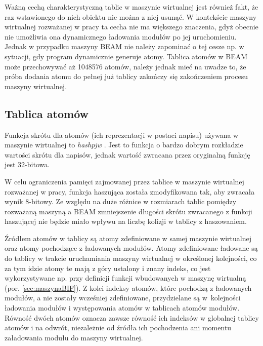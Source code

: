 Ważną cechą charakterystyczną tablic w maszynie wirtualnej jest również fakt, że raz wstawionego do nich obiektu nie można z niej usunąć. W kontekście maszyny wirtualnej rozważanej w pracy ta cecha nie ma większego znaczenia, gdyż obecnie nie umożliwia ona dynamicznego ładowania modułów po jej uruchomieniu. Jednak w przypadku maszyny BEAM nie należy zapominać o tej cesze np. w sytuacji, gdy program dynamicznie generuje atomy. Tablica atomów w BEAM może przechowywać aż 1048576 atomów, należy jednak mieć na uwadze to, że próba dodania atomu do pełnej już tablicy zakończy się zakończeniem procesu maszyny wirtualnej.

\subsection{Tablica atomów}
\label{sub:maszynaTablicaAtomow}

Funkcja skrótu dla atomów (ich reprezentacji w postaci napisu) używana w maszynie wirtualnej to \emph{hashpjw} \cite{Aho1986}. Jest to funkcja o bardzo dobrym rozkładzie wartości skrótu dla napisów, jednak wartość zwracana przez oryginalną funkcję jest 32-bitowa.

W celu ograniczenia pamięci zajmowanej przez tablice w maszynie wirtualnej rozważanej w pracy, funkcja haszująca została zmodyfikowana tak, aby zwracała wynik 8-bitowy. Ze względu na duże różnice w rozmiarach tablic pomiędzy rozważaną maszyną a BEAM zmniejszenie długości skrótu zwracanego z funkcji haszującej nie będzie miało wpływu na liczbę kolizji w tablicy z haszowaniem. 

Źródłem atomów w tablicy są atomy zdefiniowane w samej maszynie wirtualnej oraz atomy pochodzące z ładowanych modułów. Atomy zdefiniowane ładowane są do tablicy w trakcie uruchamiania maszyny wirtualnej w określonej kolejności, co za tym idzie atomy te mają z góry ustalony i znany indeks, co jest wykorzystywane np. przy definicji funkcji wbudowanych w maszynę wirtualną (por. \ref{sec:maszynaBIF}). Z kolei indeksy atomów, które pochodzą z ładowanych modułów, a nie zostały wcześniej zdefiniowane, przydzielane są w~kolejności ładowania modułów i występowania atomów w tablicach atomów modułów. Równość dwóch atomów oznacza zawsze równość ich indeksów w globalnej tablicy atomów i na odwrót, niezależnie od źródła ich pochodzenia ani momentu załadowania modułu do maszyny wirtualnej.

